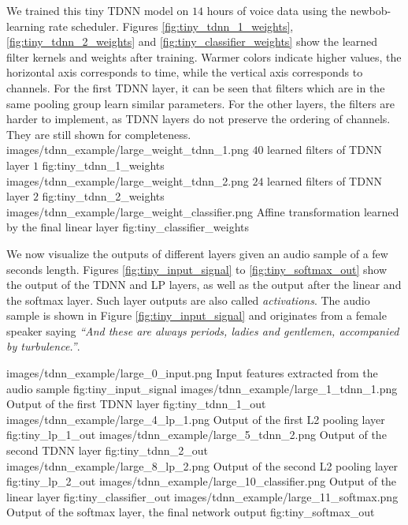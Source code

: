 We trained this tiny TDNN model on $14$ hours of voice data using the newbob-learning rate scheduler. Figures \ref{fig:tiny_tdnn_1_weights}, \ref{fig:tiny_tdnn_2_weights} and \ref{fig:tiny_classifier_weights} show the learned filter kernels and weights after training. Warmer colors indicate higher values, the horizontal axis corresponds to time, while the vertical axis corresponds to channels. For the first TDNN layer, it can be seen that filters which are in the same pooling group learn similar parameters. For the other layers, the filters are harder to implement, as TDNN layers do not preserve the ordering of channels. They are still shown for completeness. \\
\noindent
\weightillustration
	{images/tdnn_example/large_weight_tdnn_1.png}
	{$40$ learned filters of TDNN layer $1$}
	{fig:tiny_tdnn_1_weights}
\weightillustration
	{images/tdnn_example/large_weight_tdnn_2.png}
	{$24$ learned filters of TDNN layer $2$}
	{fig:tiny_tdnn_2_weights}
\smallweightillustration
	{images/tdnn_example/large_weight_classifier.png}
	{Affine transformation learned by the final linear layer}
	{fig:tiny_classifier_weights}

We now visualize the outputs of different layers given an audio sample of a few seconds length. Figures \ref{fig:tiny_input_signal} to \ref{fig:tiny_softmax_out} show the output of the TDNN and LP layers, as well as the output after the linear and the softmax layer. Such layer outputs are also called \textit{activations}. The audio sample is shown in Figure \ref{fig:tiny_input_signal} and originates from a female speaker saying \textit{``And these are always periods, ladies and gentlemen, accompanied by turbulence.''}.

\noindent
\weightillustration
	{images/tdnn_example/large_0_input.png}
	{Input features extracted from the audio sample}
	{fig:tiny_input_signal}
\weightillustration
	{images/tdnn_example/large_1_tdnn_1.png}
	{Output of the first TDNN layer}
	{fig:tiny_tdnn_1_out}
\weightillustration
	{images/tdnn_example/large_4_lp_1.png}
	{Output of the first L2 pooling layer}
	{fig:tiny_lp_1_out}
\weightillustration
	{images/tdnn_example/large_5_tdnn_2.png}
	{Output of the second TDNN layer}
	{fig:tiny_tdnn_2_out}
\weightillustration
	{images/tdnn_example/large_8_lp_2.png}
	{Output of the second L2 pooling layer}
	{fig:tiny_lp_2_out}
\weightillustration
	{images/tdnn_example/large_10_classifier.png}
	{Output of the linear layer}
	{fig:tiny_classifier_out}
\weightillustration
	{images/tdnn_example/large_11_softmax.png}
	{Output of the softmax layer, the final network output}
	{fig:tiny_softmax_out}


